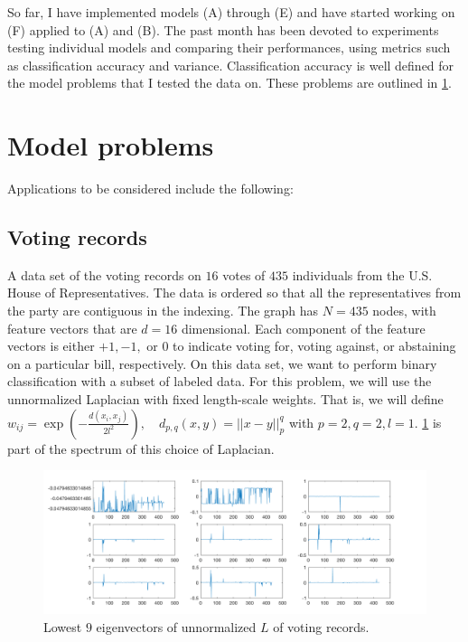 \documentclass{siamart1116}
\begin{document}
    So far, I have implemented models (A) through (E) and have started working on (F) applied to (A) and (B). The past month has been devoted to experiments testing individual models and comparing their performances, using metrics such as classification accuracy and variance. Classification accuracy is well defined for the model problems that I tested the data on. These problems are outlined in \cref{sec:model_problems}.

\section{Model problems} \label{sec:model_problems}
    Applications to be considered include the following:
    \subsection{Voting records}
        A data set of the voting records on $16$ votes of $435$ individuals from the U.S. House of Representatives. The data is ordered so that all the representatives from the party are contiguous in the indexing. The graph has $N=435$ nodes, with feature vectors that are $d=16$ dimensional. Each component of the feature vectors is either $+1,-1,$ or $0$ to indicate voting for, voting against, or abstaining on a particular bill, respectively. On this data set, we want to perform binary classification with a subset of labeled data. For this problem, we will use the unnormalized Laplacian with fixed length-scale weights. That is, we will define $w_{ij} = \exp\left({-\frac{d(x_i,x_j)}{2l^2}}\right), \quad d_{p,q}(x,y) = ||x-y||^q_p$ with $p=2,q=2,l=1$. \cref{fig:voting_spec} is part of the spectrum of this choice of Laplacian.

        \begin{figure}[!htb]
        \caption{\label{fig:voting_spec} Lowest $9$ eigenvectors of unnormalized $L$ of voting records.}
        \includegraphics[width=\linewidth]{laplacians/voting_laplacian.png}
        \end{figure}
\end{document}

